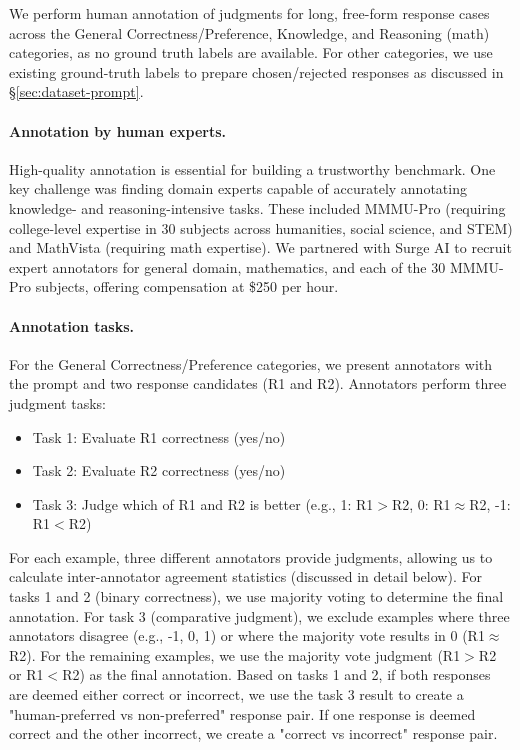We perform human annotation of judgments for long, free-form response cases across the General Correctness/Preference, Knowledge, and Reasoning (math) categories, as no ground truth labels are available. 
For other categories, we use existing ground-truth labels to prepare chosen/rejected responses as discussed in \S \ref{sec:dataset-prompt}.


\paragraph{Annotation by human experts.}
High-quality annotation is essential for building a trustworthy benchmark. One key challenge was finding domain experts capable of accurately annotating knowledge- and reasoning-intensive tasks. These included MMMU-Pro (requiring college-level expertise in 30 subjects across humanities, social science, and STEM) and MathVista (requiring math expertise). We partnered with Surge AI to recruit expert annotators for general domain, mathematics, and each of the 30 MMMU-Pro subjects, offering compensation at \$250 per hour.


\paragraph{Annotation tasks.}
For the General Correctness/Preference categories, we present annotators with the prompt and two response candidates (R1 and R2). Annotators perform three judgment tasks: \vspace{-0mm}
\begin{itemize}
\setlength{\leftskip}{0mm}
\setlength{\itemsep}{-0mm}
    \item[] Task 1: Evaluate R1 correctness (yes/no)
    \item[] Task 2: Evaluate R2 correctness (yes/no)
    \item[] Task 3: Judge which of R1 and R2 is better (e.g., 1: R1$>$R2, 0: R1$\approx$R2, -1: R1$<$R2)
    \vspace{-0mm}
\end{itemize}
For each example, three different annotators provide judgments, allowing us to calculate inter-annotator agreement statistics (discussed in detail below). For tasks 1 and 2 (binary correctness), we use majority voting to determine the final annotation. For task 3 (comparative judgment), we exclude examples where three annotators disagree (e.g., -1, 0, 1) or where the majority vote results in 0 (R1$\approx$R2). For the remaining examples, we use the majority vote judgment (R1$>$R2 or R1$<$R2) as the final annotation.
Based on tasks 1 and 2, if both responses are deemed either correct or incorrect, we use the task 3 result to create a "human-preferred vs non-preferred" response pair. If one response is deemed correct and the other incorrect, we create a "correct vs incorrect" response pair.

